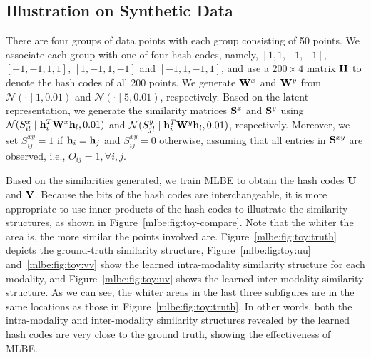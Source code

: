 
\subsection{Illustration on Synthetic Data}
\label{sec:exps:synthetic}

There are four groups of data points with each group consisting of 50 points.  We associate each group with one of four hash codes, namely, $ [1, 1, -1, -1] $, $ [-1, -1, 1, 1] $, $ [1, -1, 1, -1] $ and $ [-1, 1, -1, 1] $, and use
a $200\times 4 $ matrix $\H $ to denote the hash codes of all 200 points.  We generate $ \W^{x} $ and $ \W^{y} $ from $ \mathcal{N}(\cdot\mid 1, 0.01) $ and  $ \mathcal{N}(\cdot\mid 5, 0.01) $, respectively.  Based on the latent representation, we generate the similarity matrices $ \S^{x}$ and $ \S^{y} $ using $ \mathcal{N}(S^{x}_{il} \mid \h_{i}^{T}\W^{x}\h_{l}, 0.01) $ and $ \mathcal{N}(S^{y}_{jl} \mid \h_{i}^{T}\W^{y}\h_{l}, 0.01) $, respectively. Moreover, we set $ S^{xy}_{ij} = 1 $ if $  \h_{i}=\h_j $ and $ S^{xy}_{ij} = 0$ otherwise, assuming that all entries in $ \S^{xy}$ are observed, i.e., $ O_{ij} = 1, \forall i,j$.

Based on the similarities generated, we train \mbox{MLBE} to obtain the hash codes $\U$ and $\V$.  Because the bits of the hash codes are interchangeable, it is more appropriate to use inner products of the hash codes to illustrate the similarity structures, as shown in Figure~\ref{mlbe:fig:toy-compare}. Note that the whiter the area is, the more similar the points involved are. Figure~\ref{mlbe:fig:toy:truth} depicts the ground-truth similarity structure, Figure~\ref{mlbe:fig:toy:uu} and~\ref{mlbe:fig:toy:vv} show the learned intra-modality similarity structure for each modality, and Figure~\ref{mlbe:fig:toy:uv} shows the learned inter-modality similarity structure.  As we can see, the whiter areas in the last three subfigures are in the same locations as those in Figure~\ref{mlbe:fig:toy:truth}.  In other words, both the intra-modality and inter-modality similarity structures revealed by the learned hash codes are very close to the ground truth, showing the effectiveness of \mbox{MLBE}. %

